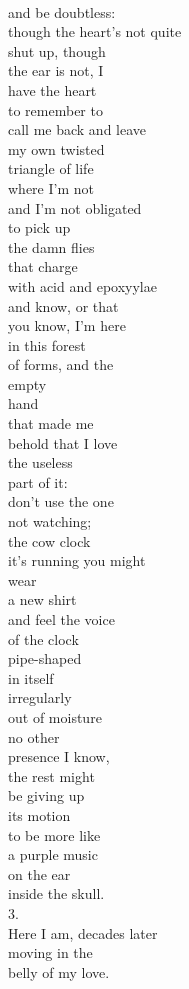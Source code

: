 \documentclass[smalldemyvopaper,11pt,twoside,onecolumn,openright,extrafontsizes]{memoir}
\begin{document}
\\and be doubtless:
\\though the heart's not quite
\\shut up, though
\\the ear is not, I
\\have the heart
\\to remember to
\\call me back and leave
\\my own twisted
\\triangle of life
\\where I'm not
\\and I'm not obligated
\\to pick up
\\the damn flies
\\that charge
\\with acid and epoxyylae
\\and know, or that
\\you know, I'm here
\\in this forest
\\of forms, and the
\\empty
\\hand
\\that made me
\\behold that I love
\\the useless
\\part of it:
\\don't use the one
\\not watching;
\\the cow clock
\\it's running you might
\\wear
\\a new shirt
\\and feel the voice
\\of the clock
\\pipe-shaped
\\in itself
\\irregularly
\\out of moisture
\\no other
\\presence I know,
\\the rest might
\\be giving up
\\its motion
\\to be more like
\\a purple music
\\on the ear
\\inside the skull.
\\3.
\\Here I am, decades later
\\moving in the
\\belly of my love.
\end{document}
